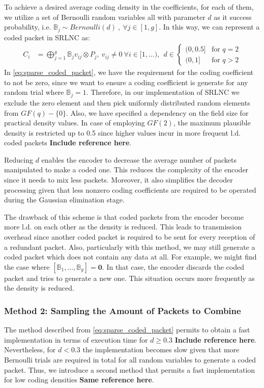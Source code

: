 To achieve a desired average coding density in the coefficients, for each
of them, we utilize a set of Bernoulli random variables all with parameter
$d$ as it success probability, i.e. $\mathbb{B}_j \sim Bernoulli(d)\ ,\ \forall
j \in [1,g]$. In this way, we can represent a coded packet in \ac{SRLNC} as:
%
\begin{align} \label{eq:sparse_coded_packet}
    C_i  &= \bigoplus_{j=1}^{g} \mathbb{B}_j v_{ij} \otimes P_j ,\ v_{ij}
    \neq 0\
    \forall i \in [1,\ldots) ,\ \
    d \in
    \begin{cases}
        {(0,0.5]} & \text{for } q = 2 \\
        {(0,1]} & \text{for } q > 2
    \end{cases}
\end{align}
%
In \eqref{eq:sparse_coded_packet}, we have the requirement for the coding
coefficient to not be zero, since we want to ensure a coding coefficient
is generate for any random trial where $\mathbb{B}_j = 1$. Therefore, in our
implementation of \ac{SRLNC} we exclude the zero element and then pick
uniformly distributed random elements from $GF(q)-\{ 0 \}$. Also, we have
specified a dependency on the field size for practical
density values. In case of employing $GF(2)$, the
maximum plausible density is restricted up to 0.5 since higher values incur
in more frequent \ac{l.d.} coded packets \textbf{Include reference here}.

Reducing $d$ enables the encoder to decrease the average number of packets
manipulated to make a coded one. This reduces the complexity of the encoder
since it needs to mix less packets. Moreover, it also simplifies the decoder
processing given that less nonzero coding coefficients are required to be
operated during the Gaussian elimination stage.

The drawback of this scheme is that coded packets from the encoder
become more \ac{l.d.} on each other as the density is reduced.
This leads to transmission overhead since another coded packet
is required to be sent for every reception of a redundant packet.
Also, particularly with this method, we may still generate a coded packet
which does not contain any data at all. For example, we might find
the case where $\left[\mathbb{B}_1, \ldots, \mathbb{B}_g \right] =
\mathbf{0}$. In that case, the encoder discards the coded packet
and tries to generate a new one. This situation occurs more frequently
as the density is reduced.

\subsubsection{Method 2: Sampling the Amount of Packets to Combine}
The method described from \eqref{eq:sparse_coded_packet} permits
to obtain a fast implementation in terms of execution time for
$d \geq 0.3$ \textbf{Include reference here}. Nevertheless, for $d < 0.3$
the implementation becomes slow given that more Bernoulli trials are
required in total for all random variables to generate a coded packet.
Thus, we introduce a second method that permits a fast implementation
for low coding densities \textbf{Same reference here}.

